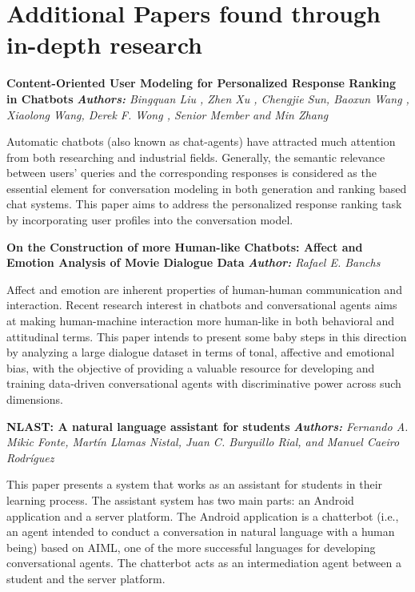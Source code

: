 \pagebreak

\section{Additional Papers found through in-depth research}

\noindent
\textbf{Content-Oriented User Modeling for Personalized Response Ranking in Chatbots}
\textit{\textbf{Authors:} Bingquan Liu , Zhen Xu , Chengjie Sun, Baoxun Wang , Xiaolong Wang, Derek F. Wong , Senior Member and Min Zhang}

Automatic chatbots (also known as chat-agents) have attracted much attention from both researching and industrial fields. Generally, the semantic relevance between users’ queries and the corresponding responses is considered as the essential element for conversation modeling in both generation and ranking based chat systems. This paper aims to address the personalized response ranking task by incorporating user profiles into the conversation model.

\noindent
\textbf{On the Construction of more Human-like Chatbots: Affect and Emotion Analysis of Movie Dialogue Data}
\textit{\textbf{Author:} Rafael E. Banchs}

Affect and emotion are inherent properties of human-human communication and interaction. Recent research interest in chatbots and conversational agents aims at making human-machine interaction more human-like in both behavioral and attitudinal terms. This paper intends to present some baby steps in this direction by analyzing a large dialogue dataset in terms of tonal, affective and emotional bias, with the objective of providing a valuable resource for developing and training data-driven conversational agents with discriminative power across such dimensions.

\noindent
\textbf{NLAST: A natural language assistant for students}
\textit{\textbf{Authors:} Fernando A. Mikic Fonte, Martín Llamas Nistal, Juan C. Burguillo Rial, and Manuel Caeiro Rodríguez}

This paper presents a system that works as an assistant for students in their learning process. The assistant system has two main parts: an Android application and a server platform. The Android application is a chatterbot (i.e., an agent intended to conduct a conversation in natural language with a human being) based on AIML, one of the more successful languages for developing conversational agents. The chatterbot acts as an intermediation agent between a student and the server platform.

